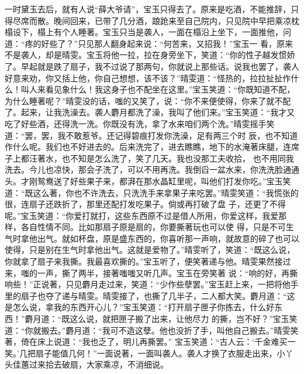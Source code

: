 \begin{parag}


    一时黛玉去后，就有人说“薛大爷请”，宝玉只得去了。原来是吃酒，不能推辞，只得尽席而散。晚间回来，已带了几分酒，踉跄来至自己院内，只见院中早把乘凉枕榻设下，榻上有个人睡著。宝玉只当是袭人，一面在榻沿上坐下，一面推他，问道：“疼的好些了？”只见那人翻身起来说：“何苦来，又招我！”宝玉一 看，原来不是袭人，却是晴雯。宝玉将他一拉，拉在身旁坐下，笑道：“你的性子越发惯娇了。早起就是跌了扇子，我不过说了那两句，你就说上那些话。说我也罢了，袭人好意来劝，你又括上他，你自己想想，该不该？”晴雯道：“怪热的，拉拉扯扯作什么！叫人来看见象什么！我这身子也不配坐在这里。”宝玉笑道：“你既知道不配，为什么睡著呢？”晴雯没的话，嗤的又笑了，说：“你不来便使得，你来了就不配了。起来，让我洗澡去。袭人麝月都洗了澡，我叫了他们来。”宝玉笑道：“我才又吃了好些酒，还得洗一洗。你既没有洗，拿了水来咱们两个洗。”晴雯摇手笑道：“罢，罢，我不敢惹爷。还记得碧痕打发你洗澡，足有两三个时 辰，也不知道作什么呢。我们也不好进去的。后来洗完了，进去瞧瞧，地下的水淹著床腿，连席子上都汪著水，也不知是怎么洗了，笑了几天。我也没那工夫收拾， 也不用同我洗去。今儿也凉快，那会子洗了，可以不用再洗。我倒舀一盆水来，你洗洗脸通通头。才刚鸳鸯送了好些果子来，都湃在那水晶缸里呢，叫他们打发你吃。”宝玉笑道：“既这么著，你也不许洗去，只洗洗手来拿果子来吃罢。”晴雯笑道：“我慌张的很，连扇子还跌折了，那里还配打发吃果子。倘或再打破了盘 子，还更了不得呢。”宝玉笑道：“你爱打就打，这些东西原不过是借人所用，你爱这样，我爱那样，各自性情不同。比如那扇子原是扇的，你要撕著玩也可以使 得，只是不可生气时拿他出气。就如杯盘，原是盛东西的，你喜听那一声响，就故意的碎了也可以使得，只是别在生气时拿他出气。这就是爱物了。”晴雯听了，笑道：“既这么说，你就拿了扇子来我撕。我最喜欢撕的。”宝玉听了，便笑著递与他。晴雯果然接过来，嗤的一声，撕了两半，接著嗤嗤又听几声。宝玉在旁笑著 说：“响的好，再撕响些！”正说著，只见麝月走过来，笑道：“少作些孽罢。”宝玉赶上来，一把将他手里的扇子也夺了递与晴雯。晴雯接了，也撕了几半子，二人都大笑。麝月道：“这是怎么说，拿我的东西开心儿？”宝玉笑道：“打开扇子匣子你拣去，什么好东西！”麝月道：“既这么说，就把匣子搬了出来，让他尽力 的撕，岂不好？”宝玉笑道：“你就搬去。”麝月道：“我可不造这孽。他也没折了手，叫他自己搬去。”晴雯笑著，倚在床上说道：“我也乏了，明儿再撕罢。” 宝玉笑道：“古人云：‘千金难买一笑。’几把扇子能值几何！”一面说著，一面叫袭人。袭人才换了衣服走出来，小丫头佳蕙过来拾去破扇，大家乘凉，不消细说。
\end{parag}


